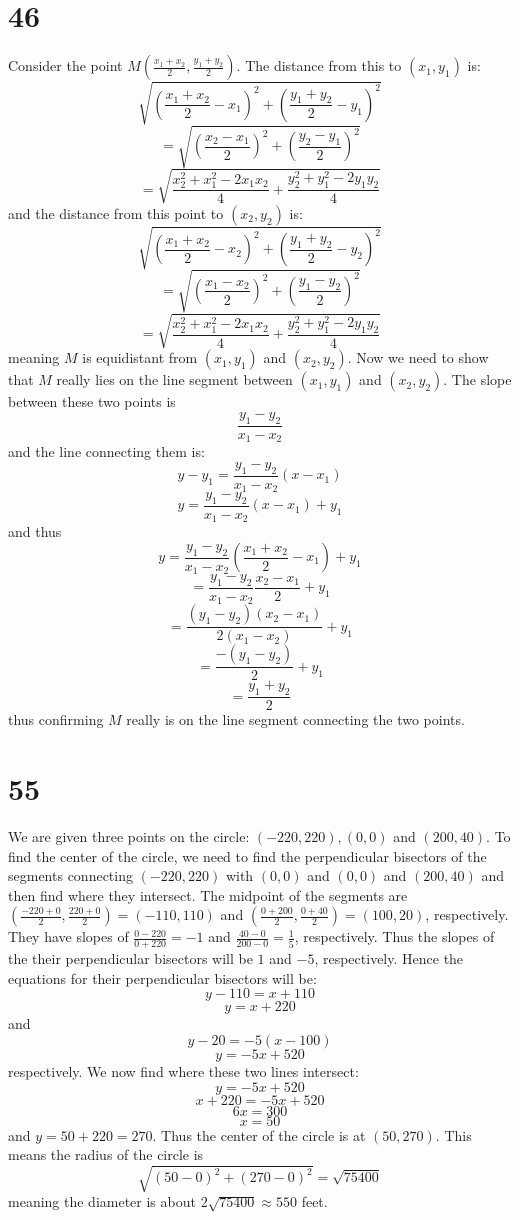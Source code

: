 \documentclass{article}
\theoremstyle{definition}
\newcommand{\?}{\stackrel{?}{=}}
\begin{document}
\section*{46}
Consider the point $M(\frac{x_1+x_2}{2},\frac{y_1+y_2}{2})$.
The distance from this to $(x_1,y_1)$ is:
\[ \sqrt{(\frac{x_1+x_2}{2}-x_1)^2+(\frac{y_1+y_2}{2}-y_1)^2} \] 
\[ =\sqrt{(\frac{x_2-x_1}{2})^2+(\frac{y_2-y_1}{2})^2} \] 
\[ =\sqrt{\frac{x_2^2+x_1^2-2x_1x_2}{4}+\frac{y_2^2+y_1^2-2y_1y_2}{4}} \]
and the distance from this point to $(x_2,y_2)$ is:
\[ \sqrt{(\frac{x_1+x_2}{2}-x_2)^2+(\frac{y_1+y_2}{2}-y_2)^2} \]
\[ =\sqrt{(\frac{x_1-x_2}{2})^2+(\frac{y_1-y_2}{2})^2} \]
\[ =\sqrt{\frac{x_2^2+x_1^2-2x_1x_2}{4}+\frac{y_2^2+y_1^2-2y_1y_2}{4}} \]
meaning $M$ is equidistant from $(x_1,y_1)$ and $(x_2,y_2)$. Now we need to show that $M$ really lies on 
the line segment between $(x_1,y_1)$ and $(x_2,y_2)$. The slope between these two points is
\[ \frac{y_1-y_2}{x_1-x_2} \] and the line connecting them is:
\[ y-y_1=\frac{y_1-y_2}{x_1-x_2}(x-x_1) \]
\[ y=\frac{y_1-y_2}{x_1-x_2}(x-x_1)+y_1 \]
and thus
\[ y=\frac{y_1-y_2}{x_1-x_2}(\frac{x_1+x_2}{2}-x_1)+y_1 \]
\[ =\frac{y_1-y_2}{x_1-x_2}\frac{x_2-x_1}{2}+y_1 \]
\[ =\frac{(y_1-y_2)(x_2-x_1)}{2(x_1-x_2)}+y_1 \]
\[ =\frac{-(y_1-y_2)}{2}+y_1 \]
\[ =\frac{y_1+y_2}{2} \] thus confirming $M$ really is on the line segment connecting the two points.

\section*{55}
We are given three points on the circle: $(-220,220),(0,0)$ and $(200,40)$. To find the center of the circle, we need to find the perpendicular bisectors of the segments connecting 
$(-220,220)$ with $(0,0)$ and $(0,0)$ and $(200,40)$ and then find where they intersect. The midpoint of the segments are 
$(\frac{-220+0}{2},\frac{220+0}{2})=(-110,110)$ and $(\frac{0+200}{2},\frac{0+40}{2})=(100,20)$, respectively. They have slopes of 
$\frac{0-220}{0+220}=-1$ and $\frac{40-0}{200-0}=\frac{1}{5}$, respectively. Thus the slopes of the their perpendicular bisectors will be 
$1$ and $-5$, respectively. Hence the equations for their perpendicular bisectors will be:
\[ y-110=x+110 \] \[ y=x+220 \] and \[ y-20=-5(x-100) \] \[ y=-5x+520 \] respectively. We now find where these two lines intersect:
\[ y=-5x+520 \] \[ x+220=-5x+520 \] \[ 6x=300 \] \[ x=50 \] and $y=50+220=270$. Thus the center of the circle is at 
$(50,270)$. This means the radius of the circle is 
\[ \sqrt{(50-0)^2+(270-0)^2}=\sqrt{75400} \] meaning the diameter is about 
$2\sqrt{75400}\approx 550$ feet.
\end{document}
